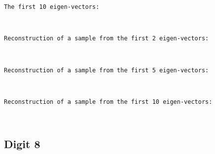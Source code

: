 \documentclass[11pt]{article}
\begin{document}
    \begin{Verbatim}[commandchars=\\\{\}]
The first 10 eigen-vectors:
    \end{Verbatim}

    \begin{center}
    \end{center}
    { \hspace*{\fill} \\}
    
    \begin{Verbatim}[commandchars=\\\{\}]
Reconstruction of a sample from the first 2 eigen-vectors:
    \end{Verbatim}

    \begin{center}
    \end{center}
    { \hspace*{\fill} \\}
    
    \begin{Verbatim}[commandchars=\\\{\}]
Reconstruction of a sample from the first 5 eigen-vectors:
    \end{Verbatim}

    \begin{center}
    \end{center}
    { \hspace*{\fill} \\}
    
    \begin{Verbatim}[commandchars=\\\{\}]
Reconstruction of a sample from the first 10 eigen-vectors:
    \end{Verbatim}

    \begin{center}
    \end{center}
    { \hspace*{\fill} \\}
    \pagebreak
    
    \hypertarget{digit-8}{%
\subsection{Digit 8}\label{digit-8}}
\end{document}
